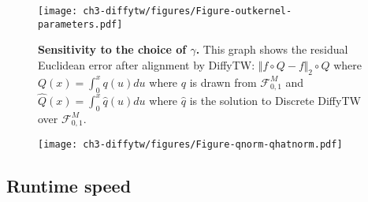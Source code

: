 \begin{figure}[ht!]
\centering
\texttt{[image: ch3-diffytw/figures/Figure-outkernel-parameters.pdf]}
\caption[Sensitivity of DiffyTW to the choice of $\gamma$.]{\textbf{Sensitivity to the choice of $\gamma$.} This graph shows the residual Euclidean error after alignment by DiffyTW: $\Vert f\circ Q - f\Vert_2\circ \hat Q$ where $Q(x) = \int_0^x q(u)du$ where $q$ is drawn from $\mathcal F_{0,1}^M$ and $\hat Q(x) = \int_0^x \hat q(u)du$ where $\hat q$ is the solution to Discrete DiffyTW over $\mathcal F_{0,1}^M$.}
\end{figure}

\begin{figure}[ht!]
\centering
\texttt{[image: ch3-diffytw/figures/Figure-qnorm-qhatnorm.pdf]}
\caption{}
\end{figure}


\subsection{Runtime speed}
